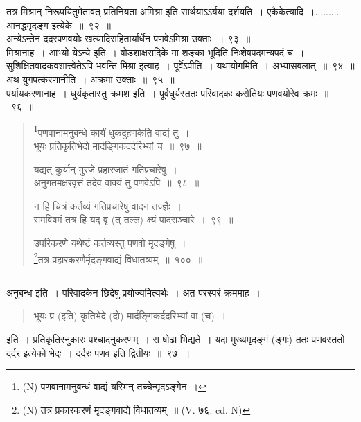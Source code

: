 \documentclass[11pt, openany]{book}
\begin{document}
तत्र मिश्रान् निरूपयितुमेतावत् प्रतिनियता अमिश्रा इति सार्थयाऽऽर्यया दर्शयति~। {\qtt एकैकेत्यादि}~।......... आनद्धमृदङ्ग इत्येके~॥~९२~॥\\

अन्येऽन्तेन ददरपणवयोः खत्यादिसहितार्यार्धेन पणवेऽमिश्रा उक्ताः~॥~९३~॥\\

{\qtt मिश्रानाह}~। आभ्यो येऽन्ये इति~। षोडशाक्षरादिके मा शङ्का भूदिति निःशेषपदमन्यपदं च~। सुशिक्षितवादकवशात्त्वेतेऽपि भवन्ति मिश्रा इत्याह~। {\qtt पूर्वेऽपीति}~। यथायोगमिति~। अभ्यासबलात्~॥~९४~॥\\

अथ युगपत्करणानीति~। अक्रमा उक्ताः~॥~९५~॥\\

{\qtt पर्यायकरणानाह}~। धुर्यकृतास्तु क्रमश इति~। पूर्वधुर्यस्ततः परिवादकः करोतियः पणवयोरेव क्रमः~॥~९६~॥

\newpage

\begin{quote}
{\na \renewcommand{\thefootnote}{1}\footnote{(N) पणवानामनुबन्धं वाद्यं यस्मिन् तच्चेन्मृदऽङ्गेन~।}पणवानामनुबन्धे कार्यं धुकदुहणकेति वाद्यं तु~।\\
भूयः प्रतिकृतिभेदो मार्दङ्गिकदर्दरिभ्यां च~॥~९७~॥

यद्यत् कुर्यान् मुरजे प्रहारजातं गतिप्रचारेषु~।\\
अनुगतमक्षरवृत्तं तदेव वाक्यं तु पणवेऽपि~॥~९८~॥

न हि चित्रं कर्तव्यं गतिप्रचारेषु वादनं तज्ज्ञैः~।\\
समविषमं तत्र हि यद् वृ (त् तल्ल) क्ष्यं पादसञ्चारे~।~९९~॥

उपरिकरणे यथेष्टं कर्तव्यस्तु पणवो मृदङ्गेषु~।\\
\renewcommand{\thefootnote}{2}\footnote{(N) तत्र प्रकारकरणं मृदङ्गवाद्ये विधातव्यम्~॥ (V. ७६. cd. N)}तत्र प्रहारकरणैर्मृदङ्गवाद्यं विधातव्यम्~॥~१००~॥}
\end{quote}

\hrule

\vspace{2mm}
{\qtt अनुबन्ध} इति~। परिवादकेन छिद्रेषु प्रयोज्यमित्यर्थः~। अत परस्परं क्रममाह~। 

\begin{quote}
{\qt भूयः प्र (इति) कृतिभेदे (दो) मार्दङ्गिकर्ददरिभ्यां वा (च)~।}
\end{quote}

\noindent
इति~। प्रतिकृतिरनुकारः पश्चादनुकरणम्~। स षोढा भिद्यते~। यदा मुख्यमृदङ्गं (ङ्गः) ततः पणवस्ततो दर्दर इत्येको भेदः~। दर्दरः पणव इति द्वितीयः~॥~९७~॥\\
\end{document}

